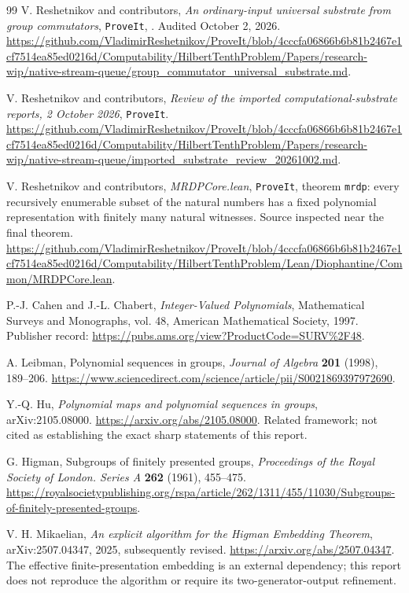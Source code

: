 \documentclass[11pt,letterpaper]{article}
\theoremstyle{definition}
\theoremstyle{remark}
\newcommand{\repo}{\texttt{ProveIt}}
\begin{document}
\begin{thebibliography}{99}
V. Reshetnikov and contributors, \emph{An ordinary-input universal substrate from group commutators}, \repo, . Audited October 2, 2026. \url{https://github.com/VladimirReshetnikov/ProveIt/blob/4cccfa06866b6b81b2467e1cf7514ea85ed0216d/Computability/HilbertTenthProblem/Papers/research-wip/native-stream-queue/group_commutator_universal_substrate.md}.

V. Reshetnikov and contributors, \emph{Review of the imported computational-substrate reports, 2 October 2026}, \repo. \url{https://github.com/VladimirReshetnikov/ProveIt/blob/4cccfa06866b6b81b2467e1cf7514ea85ed0216d/Computability/HilbertTenthProblem/Papers/research-wip/native-stream-queue/imported_substrate_review_20261002.md}.

V. Reshetnikov and contributors, \emph{MRDPCore.lean}, \repo, theorem \texttt{mrdp}: every recursively enumerable subset of the natural numbers has a fixed polynomial representation with finitely many natural witnesses. Source inspected near the final theorem. \url{https://github.com/VladimirReshetnikov/ProveIt/blob/4cccfa06866b6b81b2467e1cf7514ea85ed0216d/Computability/HilbertTenthProblem/Lean/Diophantine/Common/MRDPCore.lean}.

P.-J. Cahen and J.-L. Chabert, \emph{Integer-Valued Polynomials}, Mathematical Surveys and Monographs, vol. 48, American Mathematical Society, 1997. Publisher record: \url{https://pubs.ams.org/view?ProductCode=SURV%2F48}.

A. Leibman, Polynomial sequences in groups, \emph{Journal of Algebra} \textbf{201} (1998), 189--206. \url{https://www.sciencedirect.com/science/article/pii/S0021869397972690}.

Y.-Q. Hu, \emph{Polynomial maps and polynomial sequences in groups}, arXiv:2105.08000. \url{https://arxiv.org/abs/2105.08000}. Related framework; not cited as establishing the exact sharp statements of this report.

G. Higman, Subgroups of finitely presented groups, \emph{Proceedings of the Royal Society of London. Series A} \textbf{262} (1961), 455--475. \url{https://royalsocietypublishing.org/rspa/article/262/1311/455/11030/Subgroups-of-finitely-presented-groups}.

V. H. Mikaelian, \emph{An explicit algorithm for the Higman Embedding Theorem}, arXiv:2507.04347, 2025, subsequently revised. \url{https://arxiv.org/abs/2507.04347}. The effective finite-presentation embedding is an external dependency; this report does not reproduce the algorithm or require its two-generator-output refinement.


\end{thebibliography}
\end{document}

